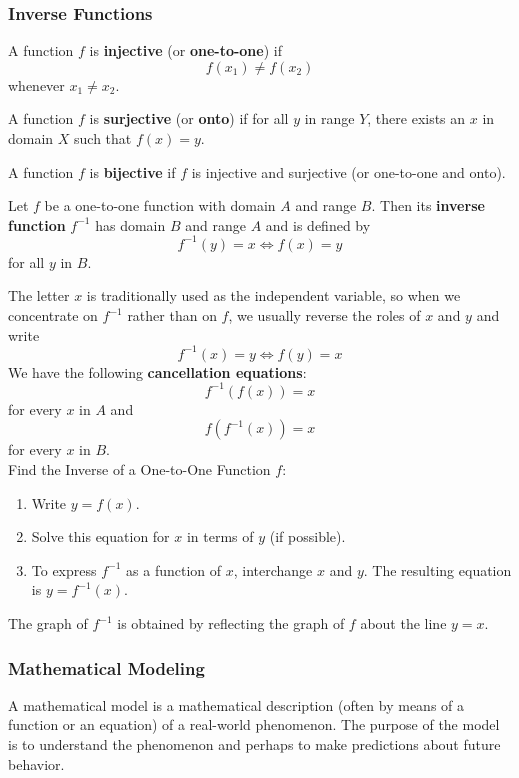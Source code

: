\subsubsection*{Inverse Functions}
\begin{definition}
    A function \(f\) is \textbf{injective} (or \textbf{one-to-one}) if
    \[f(x_1)\neq f(x_2)\]
    whenever \(x_1\neq x_2\).
\end{definition}
\begin{definition}
    A function \(f\) is \textbf{surjective} (or \textbf{onto}) if for all
    \(y\) in range \(Y\),
    there exists an \(x\) in domain \(X\) such that \(f(x)=y\).
\end{definition}
\begin{definition}
    A function \(f\) is \textbf{bijective} if \(f\) is injective and
    surjective (or one-to-one and onto).
\end{definition}
\begin{definition}
    Let \(f\) be a one-to-one function with domain \(A\) and range \(B\).
    Then its \textbf{inverse function} \(f^{-1}\) has domain \(B\) and range
    \(A\) and is defined by
    \[f^{-1}(y)=x\iff f(x)=y\]
    for all \(y\) in \(B\).
\end{definition}
The letter \(x\) is traditionally used as the independent variable, so when we
concentrate on \(f^{-1}\) rather than on \(f\), we usually reverse the roles
of \(x\) and \(y\) and write
\[f^{-1}(x)=y\iff f(y)=x\]
We have the following \textbf{ cancellation equations}:
\[f^{-1}(f(x))=x\]
for every \(x\) in \(A\) and
\[f(f^{-1}(x))=x\]
for every \(x\) in \(B\). \\
Find the Inverse of a One-to-One Function \(f\):
\begin{enumerate}
    \item Write \(y=f(x)\).
    \item Solve this equation for \(x\) in terms of \(y\) (if possible).
    \item To express \(f^{-1}\) as a function of \(x\), interchange \(x\) and
    \(y\).
    The resulting equation is \(y=f^{-1}(x)\).
\end{enumerate}
The graph of \(f^{-1}\) is obtained by reflecting the graph of \(f\) about the
line \(y=x\).

\subsubsection*{Mathematical Modeling}
A mathematical model is a mathematical description (often by means of a
function or an equation) of a real-world phenomenon.
The purpose of the model is to understand the phenomenon and perhaps
to make predictions about future behavior.

